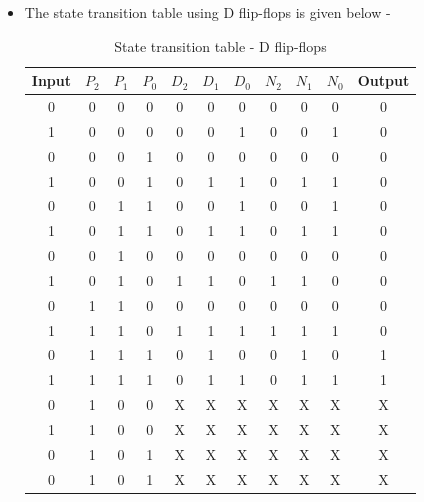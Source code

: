 \documentclass[a4paper,12pt]{article}
\begin{document}
\begin{itemize}
\item The state transition table using D flip-flops is given below - 
\begin{table}[!ht]
    \centering
    \begin{tabular}{|c||c|c|c||c|c|c||c|c|c||c|}
        \hline
        \textbf{Input} & \textbf{$P_{2}$} &  \textbf{$P_1$} & \textbf{$P_0$} & \textbf{$D_2$} & \textbf{$D_1$} & \textbf{$D_0$} & \textbf{$N_2$} & \textbf{$N_1$} & \textbf{$N_0$} & \textbf{Output}\\
        \hline
        0 & 0 & 0 & 0 & 0 & 0 & 0 & 0 & 0 & 0 & 0 \\
        \hline
        1 & 0 & 0 & 0 & 0 & 0 & 1 & 0 & 0 & 1 & 0 \\
        \hline
        0 & 0 & 0 & 1 & 0 & 0 & 0 & 0 & 0 & 0 & 0 \\
        \hline
        1 & 0 & 0 & 1 & 0 & 1 & 1 & 0 & 1 & 1 & 0 \\
        \hline
        0 & 0 & 1 & 1 & 0 & 0 & 1 & 0 & 0 & 1 & 0 \\
        \hline
        1 & 0 & 1 & 1 & 0 & 1 & 1 & 0 & 1 & 1 & 0 \\
        \hline
        0 & 0 & 1 & 0 & 0 & 0 & 0 & 0 & 0 & 0 & 0 \\
        \hline
        1 & 0 & 1 & 0 & 1 & 1 & 0 & 1 & 1 & 0 & 0 \\
        \hline
        0 & 1 & 1 & 0 & 0 & 0 & 0 & 0 & 0 & 0 & 0 \\
        \hline
        1 & 1 & 1 & 0 & 1 & 1 & 1 & 1 & 1 & 1 & 0 \\
        \hline
        0 & 1 & 1 & 1 & 0 & 1 & 0 & 0 & 1 & 0 & 1 \\
        \hline
        1 & 1 & 1 & 1 & 0 & 1 & 1 & 0 & 1 & 1 & 1 \\
        \hline
        0 & 1 & 0 & 0 & X & X & X & X & X & X & X \\
        \hline
        1 & 1 & 0 & 0 & X & X & X & X & X & X & X \\
        \hline
        0 & 1 & 0 & 1 & X & X & X & X & X & X & X \\
        \hline
        0 & 1 & 0 & 1 & X & X & X & X & X & X & X \\
        \hline
        
    \end{tabular}
    \caption{State transition table - D flip-flops}
    \label{tab:state_transiton_table_d}
\end{table}


\end{itemize}
\end{document}
